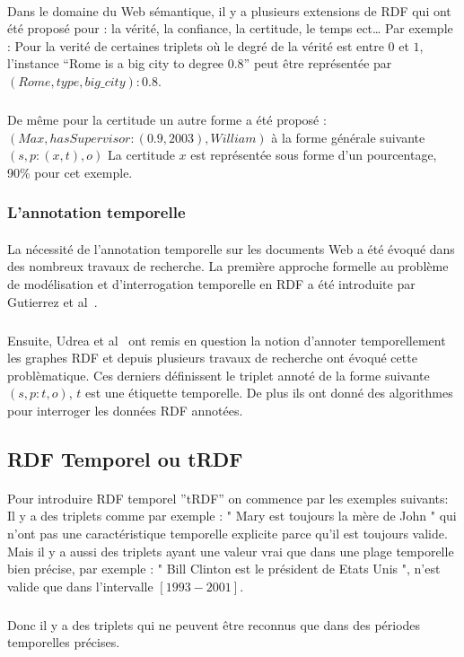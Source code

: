 \documentclass[12pt,a4	]{report}
\begin{document}
\paragraph{}
Dans le domaine du Web sémantique, il y a plusieurs extensions de RDF qui ont été proposé pour : la vérité, la confiance, la certitude, le temps ect…
Par exemple : Pour la verité de certaines triplets où le degré de la vérité est entre $0$ et $1$, l’instance “Rome is a big city to degree 0.8” peut être représentée par $(Rome, type,big{\_}city) : 0.8$.
\subparagraph{}
De même pour la certitude un autre forme a été proposé :
$(Max,hasSupervisor : (0.9,2003),William)$ à la forme générale suivante $(s, p : (x,t),o)$
\newline 
La certitude $x$ est représentée sous forme d'un pourcentage, 90\% pour cet exemple.
\subsubsection*{L'annotation temporelle}
\paragraph{}
La nécessité de l’annotation temporelle sur les documents Web a été évoqué dans des nombreux travaux de recherche. La première approche formelle au problème de modélisation et d’interrogation temporelle en RDF a été introduite par Gutierrez et al~\cite{gutierrez2005}.
\subparagraph{}
Ensuite, Udrea et al~\cite{udrea2006} ont remis en question la notion d'annoter temporellement les graphes RDF et depuis plusieurs travaux de recherche ont évoqué cette problèmatique. 
Ces derniers définissent le triplet annoté de la forme suivante $(s,p:t,o)$, $t$ est une étiquette temporelle.
De plus ils ont donné des algorithmes pour interroger les données RDF annotées.	

\subsection*{RDF Temporel ou tRDF}
\paragraph{}
Pour introduire RDF temporel ''tRDF'' on commence par les exemples suivants:
\newline
Il y a des triplets comme par exemple : " Mary est toujours la mère de John " qui n'ont pas une caractéristique temporelle explicite parce qu'il est toujours valide. Mais il y a aussi des triplets ayant une valeur vrai que dans une plage temporelle bien précise, par exemple : " Bill Clinton est le président de Etats Unis ", n'est valide que dans l'intervalle $[1993-2001]$.   
\subparagraph{}
Donc il y a des triplets qui ne peuvent être reconnus que dans des périodes temporelles précises.
\end{document}
